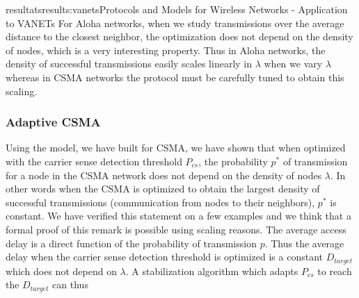 \documentclass{ra2016}
\begin{document}
\begin{module}{resultats}{results:vanets}{Protocols and Models for Wireless Networks - Application to VANETs}
For Aloha networks, when we study transmissions over the average distance to the closest 
neighbor, the optimization does not depend on the density of nodes, 
which is a very interesting property. Thus in Aloha networks, the density of 
successful transmissions easily scales linearly in $\lambda$ when we vary 
$\lambda$ whereas in CSMA networks the protocol must be carefully 
tuned to obtain this scaling. 

\subsubsection{Adaptive CSMA}

\begin{participants}
\end{participants}

Using the model, we have built for CSMA, we have shown that when optimized 
with the carrier sense detection threshold $P_{cs}$, 
the probability $p^*$ of transmission for a node 
in the CSMA network does not depend on the density of nodes $\lambda$. 
In other words when the CSMA is optimized to obtain the largest density of successful 
transmissions (communication from nodes to their neighbors), $p^*$  is constant.
We have verified this statement 
on a few examples and we think that a formal proof of this remark is possible using 
scaling  reasons. The average access delay is a direct function of the probability of transmission $p$. Thus the average delay when the carrier sense detection threshold is optimized 
is a constant $D_{target}$ which does not depend on $\lambda$. 
A stabilization algorithm which 
adapts $P_{cs}$ to reach the $D_{target}$ can thus 


\end{module} 

\end{document}
